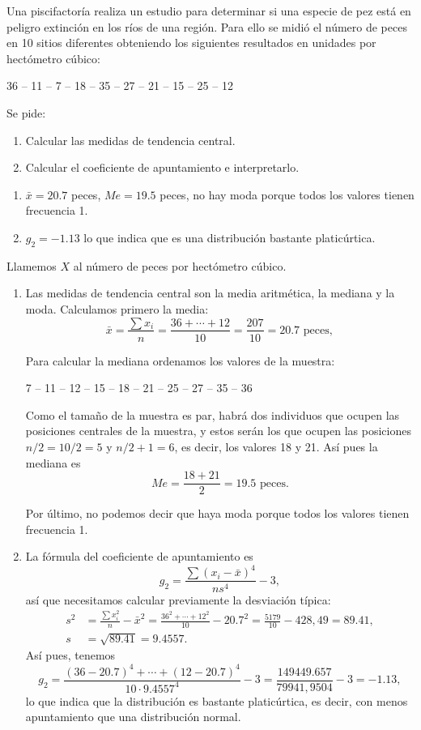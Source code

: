 {Una piscifactoría realiza un estudio para determinar si una especie de pez está en peligro extinción en los ríos de una región.
Para ello se midió el número de peces en 10 sitios diferentes obteniendo los siguientes resultados en unidades
por hectómetro cúbico:
\begin{center}
  36 -- 11 -- 7 -- 18 -- 35 -- 27 -- 21 -- 15 -- 25 -- 12
\end{center}
Se pide:
\begin{enumerate}
\item Calcular las medidas de tendencia central.
\item Calcular el coeficiente de apuntamiento e interpretarlo.
\end{enumerate}
}
{\begin{enumerate}
\item $\bar{x} = 20.7$ peces, $Me=19.5$ peces, no hay moda porque todos los valores tienen frecuencia 1.
\item $g_2= -1.13$ lo que indica que es una distribución bastante platicúrtica.
\end{enumerate}
}
{Llamemos $X$ al número de peces por hectómetro cúbico.
\begin{enumerate}
\item Las medidas de tendencia central son la media aritmética, la mediana y la moda. Calculamos primero la media:
\[
\bar{x} = \frac{\sum x_{i}}{n}=\frac{36+\cdots+12}{10}=\frac{207}{10}=20.7 \mbox{ peces},
\]

Para calcular la mediana ordenamos los valores de la muestra:
\begin{center}
  7 -- 11 -- 12 -- 15 -- 18 -- 21 -- 25 -- 27 -- 35 -- 36
\end{center}
Como el tamaño de la muestra es par, habrá dos individuos que ocupen las posiciones centrales de la muestra, y estos serán los que ocupen las posiciones $n/2=10/2=5$ y $n/2+1=6$, es decir, los valores 18 y 21. Así pues la mediana es
\[
Me=\frac{18+21}{2}=19.5 \mbox{ peces}.
\]

Por último, no podemos decir que haya moda porque todos los valores tienen frecuencia 1.

\item La fórmula del coeficiente de apuntamiento es
\[
g_2=\frac{\sum (x_i-\bar{x})^4}{ns^4}-3,
\]
así que necesitamos calcular previamente la desviación típica:
\begin{align*}
s^2 & = \frac{\sum x_{i}^2}{n}-\bar{x}^2 =
\frac{36^2+\cdots+12^2}{10}-20.7^2=\frac{5179}{10}-428,49=89.41,\\
s &=\sqrt{89.41}=9.4557.
\end{align*}
Así pues, tenemos
\[
g_2=\frac{(36-20.7)^4+\cdots + (12-20.7)^4}{10\cdot 9.4557^4}-3=\frac{149449.657}{79941,9504}-3=-1.13,
\]
lo que indica que la distribución es bastante platicúrtica, es decir, con menos apuntamiento que una distribución normal.
\end{enumerate}
}


